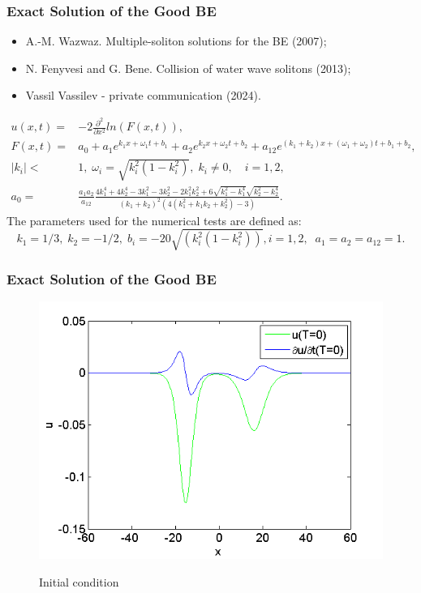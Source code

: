 \documentclass{beamer}
\newcommand{\be}{\begin{equation}}
\newcommand{\ee}{\end{equation}}
\begin{document}
\begin{frame}
\frametitle{Exact Solution of the Good BE}
\begin{itemize}
 \item A.-M. Wazwaz. Multiple-soliton solutions for the BE (2007);
 \item N. Fenyvesi and G. Bene. Collision of water wave solitons (2013);
 \item Vassil Vassilev - private communication (2024).
\end{itemize}

\begin{align}\label{orgBsqSol}
u(x,t) =& -2 \frac{\partial^2 }{\partial x^2} ln (F(x,t)),
\\
 F(x,t) =& a_0 + a_1 e^{k_1 x + \omega_1 t + b_1} + a_2 e^{k_2 x + \omega_2 t + b_2}  + a_{12} e^{(k_1 + k_2) x + (\omega_1 + \omega_2)  t + b_1 + b_2}, \nonumber
\\
|k_i| <& 1, \; \omega_i = \sqrt{k^2_i(1-k^2_i) }, \; k_i \neq 0, \quad i = 1,2, \nonumber
\\
a_0 =& \frac{a_1 a_2}{a_{12}}\frac{4k_1^4 + 4k_2^4 - 3k_1^2 - 3k_2^2 - 2k_1^2 k_2^2 + 6\sqrt{k_1^2-k_1^4}\sqrt{k_2^2-k_2^4} }{(k_1 + k_2)^2 (4(k_1^2 + k_1 k_2 + k_2^2) - 3)}.\nonumber
\end{align}
The parameters used for the numerical tests are defined as:
\be\label{params}
        k_1 = 1/3,  \; k_2 = -1/2,  \; b_i = -20\sqrt{(k_i^ 2  (1 - k_i ^ 2))}, i=1,2,  \;\; a_1 = a_2 = a_{12} = 1.
\ee

\end{frame}


\begin{frame}
\frametitle{Exact Solution of the Good BE}
\begin{figure}[ht]
	\centering
	\includegraphics[width=0.84\linewidth]{../IC.png}

Initial condition
\end{figure}
\end{frame}
\end{document}
